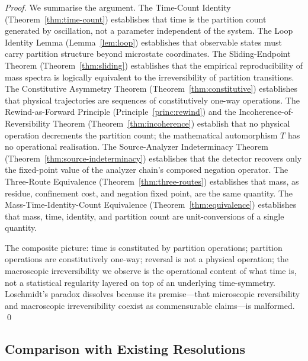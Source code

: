 \documentclass[twocolumn,10pt,a4paper]{article}
\theoremstyle{definition}
\theoremstyle{remark}
\begin{document}
\begin{proof}
We summarise the argument. The Time-Count Identity (Theorem~\ref{thm:time-count}) establishes that time is the partition count generated by oscillation, not a parameter independent of the system. The Loop Identity Lemma (Lemma~\ref{lem:loop}) establishes that observable states must carry partition structure beyond microstate coordinates. The Sliding-Endpoint Theorem (Theorem~\ref{thm:sliding}) establishes that the empirical reproducibility of mass spectra is logically equivalent to the irreversibility of partition transitions. The Constitutive Asymmetry Theorem (Theorem~\ref{thm:constitutive}) establishes that physical trajectories are sequences of constitutively one-way operations. The Rewind-as-Forward Principle (Principle~\ref{princ:rewind}) and the Incoherence-of-Reversibility Theorem (Theorem~\ref{thm:incoherence}) establish that no physical operation decrements the partition count; the mathematical automorphism $T$ has no operational realisation. The Source-Analyzer Indeterminacy Theorem (Theorem~\ref{thm:source-indeterminacy}) establishes that the detector recovers only the fixed-point value of the analyzer chain's composed negation operator. The Three-Route Equivalence (Theorem~\ref{thm:three-routes}) establishes that mass, as residue, confinement cost, and negation fixed point, are the same quantity. The Mass-Time-Identity-Count Equivalence (Theorem~\ref{thm:equivalence}) establishes that mass, time, identity, and partition count are unit-conversions of a single quantity.

The composite picture: time is constituted by partition operations; partition operations are constitutively one-way; reversal is not a physical operation; the macroscopic irreversibility we observe is the operational content of what time is, not a statistical regularity layered on top of an underlying time-symmetry. Loschmidt's paradox dissolves because its premise---that microscopic reversibility and macroscopic irreversibility coexist as commensurable claims---is malformed. \qed
\end{proof}

\subsection{Comparison with Existing Resolutions}
\end{document}
